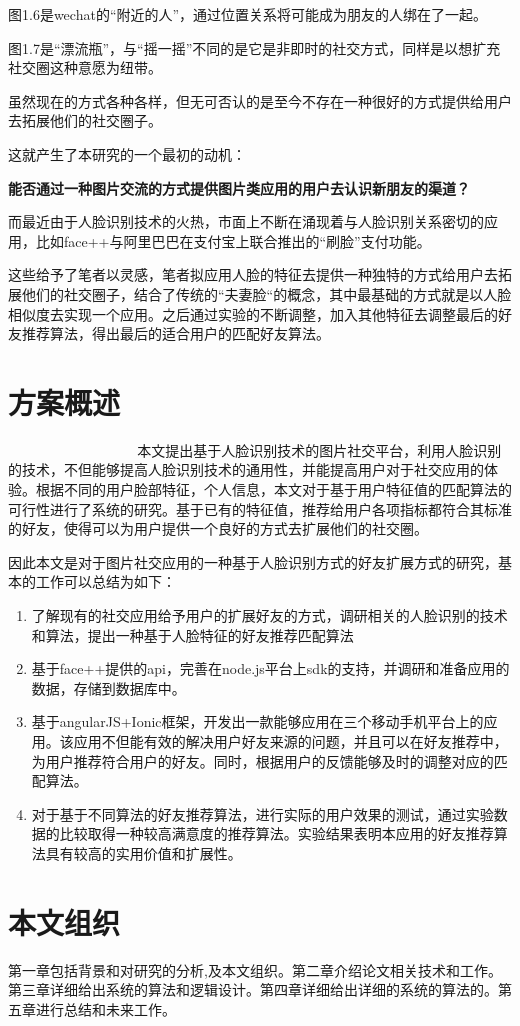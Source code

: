 图1.6是wechat的“附近的人”，通过位置关系将可能成为朋友的人绑在了一起。

图1.7是“漂流瓶”，与“摇一摇”不同的是它是非即时的社交方式，同样是以想扩充社交圈这种意愿为纽带。

虽然现在的方式各种各样，但无可否认的是至今不存在一种很好的方式提供给用户去拓展他们的社交圈子。

这就产生了本研究的一个最初的动机：

 \textbf{能否通过一种图片交流的方式提供图片类应用的用户去认识新朋友的渠道？}

而最近由于人脸识别技术的火热，市面上不断在涌现着与人脸识别关系密切的应用，比如face++与阿里巴巴在支付宝上联合推出的“刷脸”支付功能。

这些给予了笔者以灵感，笔者拟应用人脸的特征去提供一种独特的方式给用户去拓展他们的社交圈子，结合了传统的“夫妻脸“的概念，其中最基础的方式就是以人脸相似度去实现一个应用。之后通过实验的不断调整，加入其他特征去调整最后的好友推荐算法，得出最后的适合用户的匹配好友算法。
\section{方案概述}
􏰉􏴳􏰭􏴴􏴵􏴶􏴷􏰿􏴸􏴹􏴘􏰏􏲦􏲜􏱲􏴺􏰭􏴻􏲆􏴻􏴼􏰏􏱦􏴷􏱜􏰒􏴽􏳯􏴾􏴿􏵀􏱾􏱜本文提出基于人脸识别技术的图片社交平台，利用人脸识别的技术，不但能够提高人脸识别技术的通用性，并能提高用户对于社交应用的体验。根据不同的用户脸部特征，个人信息，本文对于基于用户特征值的匹配算法的可行性进行了系统的研究。基于已有的特征值，推荐给用户各项指标都符合其标准的好友，使得可以为用户提供一个良好的方式去扩展他们的社交圈。


因此本文是对于图片社交应用的一种基于人脸识别方式的好友扩展方式的研究，基本的工作可以总结为如下：
\begin{enumerate}
\item 了解现有的社交应用给予用户的扩展好友的方式，调研相关的人脸识别的技术和算法，提出一种基于人脸特征的好友推荐匹配算法
\item 基于face++提供的api，完善在node.js平台上sdk的支持，并调研和准备应用的数据，存储到数据库中。
\item 基于angularJS+Ionic框架，开发出一款能够应用在三个移动手机平台上的应用。该应用不但能有效的解决用户好友来源的问题，并且可以在好友推荐中，为用户推荐符合用户的好友。同时，根据用户的反馈能够及时的调整对应的匹配算法。
\item 对于基于不同算法的好友推荐算法，进行实际的用户效果的测试，通过实验数据的比较取得一种较高满意度的推荐算法。实验结果表明本应用的好友推荐算法具有较高的实用价值和扩展性。
\end{enumerate}

\section{本文组织}
第一章包括背景和对研究的分析,及本文组织。第二章介绍论文相关技术和工作。第三章详细给出系统的算法和逻辑设计。第四章详细给出详细的系统的算法的。第五章进行总结和未来工作。

